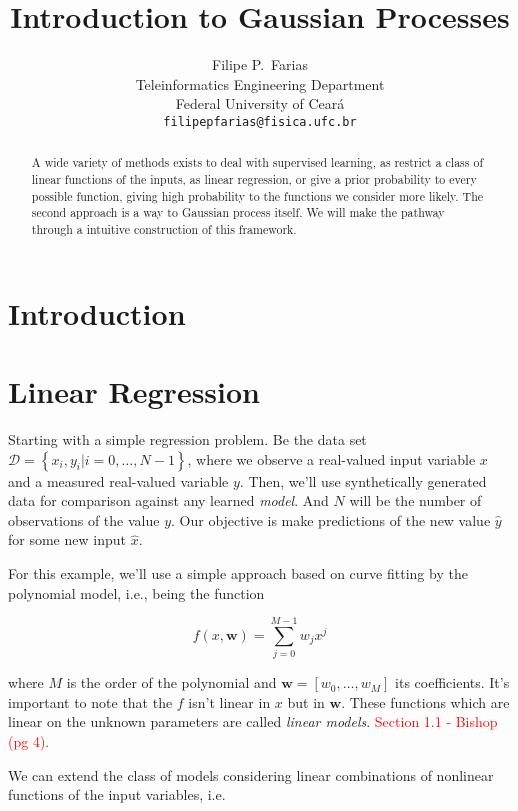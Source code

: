 \documentclass[11pt]{article} %
\title{Introduction to Gaussian Processes}
\author{
Filipe P.~Farias \\
Teleinformatics Engineering Department\\
Federal University of Ceará\\
\texttt{filipepfarias@fisica.ufc.br} \\
}
\begin{document}
\maketitle

\begin{abstract}
   A wide variety of methods exists to deal with supervised learning, as restrict a class of linear functions of the inputs, as linear regression, or give a prior probability to every possible function, giving high probability to the functions we consider more likely. The second approach is a way to Gaussian process itself. We will make the pathway through a intuitive construction of this framework.
\end{abstract}

\section{Introduction}

\lipsum[1]%
\nocite{Bishop:2006:PRM:1162264}
\nocite{Rasmussen:2005:GPM:1162254}

\section{Linear Regression}

Starting with a simple regression problem. Be the data set $\mathcal{D}=\left\{ x_i,y_i|i=0,\dots,N-1 \right\}$, where we observe a real-valued input variable $x$ and a measured real-valued variable $y$. Then, we'll use synthetically generated data for comparison against any learned \textit{model}. And $N$ will be the number of observations of the value $y$. Our objective is make predictions of the new value $\hat{y}$ for some new input $\hat{x}$.

For this example, we'll use a simple approach based on curve fitting by the polynomial model, i.e., being the function

\begin{equation}
   f(x,\mathbf{w}) = \sum_{j=0}^{M-1} w_j x^j
\end{equation}

where $M$ is the order of the polynomial and $\mathbf{w}=\left[ w_0,\dots,w_M \right]$ its coefficients. It's important to note that the $f$ isn't linear in $x$ but in $\mathbf{w}$. These functions which are linear on the unknown parameters are called \textit{linear models}.
\textcolor{red}{Section 1.1 - Bishop (pg 4).}

We can extend the class of models considering linear combinations of nonlinear functions of the input variables, i.e.
\end{document}
